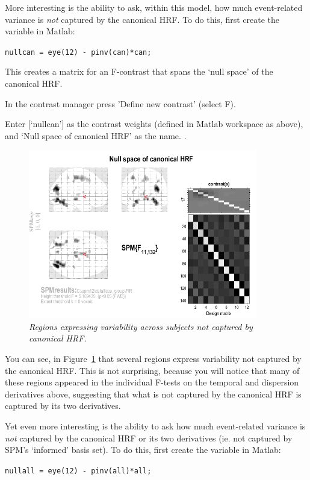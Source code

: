 More interesting is the ability to ask, within this model, how much event-related variance is {\em not} captured by the canonical HRF. To do this, first create the variable in Matlab:
\bi
\item{\verb!nullcan = eye(12) - pinv(can)*can;!}
\ei

This creates a matrix for an F-contrast that spans the `null space' of the canonical HRF.
\bi
\item{In the contrast manager press 'Define new contrast' (select F).}
\item{Enter [`nullcan'] as the contrast weights (defined in Matlab workspace as above), and `Null space of canonical HRF' as the name.}
\ei
\cite{daniel_hbf2}.
\begin{figure}
\begin{center}
\includegraphics[width=100mm]{faces_group/nullcan}
\caption{\em Regions expressing variability across subjects not captured by canonical HRF. \label{nullcan}}
\end{center}
\end{figure}
You can see, in Figure~\ref{nullcan} that several regions express variability not captured by the canonical HRF. This is not surprising, because you will notice that many of these regions appeared in the individual F-tests on the temporal and dispersion derivatives above, suggesting that what is not captured by the canonical HRF is captured by its two derivatives.

Yet even more interesting is the ability to ask how much event-related variance is {\em not} captured by the canonical HRF or its two derivatives (ie. not captured by SPM's `informed' basis set). To do this, first create the variable in Matlab: 

\bi
\item{\verb!nullall = eye(12) - pinv(all)*all;!}
\ei

